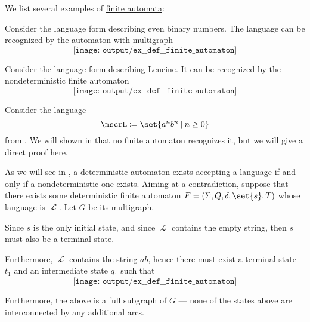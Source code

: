 \begin{example}\label{ex:def:finite_automaton}
  We list several examples of \hyperref[def:finite_automaton]{finite automata}:
  \begin{thmenum}
     Consider the language form  describing even binary numbers. The language can be recognized by the automaton with multigraph
    \begin{equation*}
      \texttt{[image: output/ex\_\_def\_\_finite\_automaton]}
    \end{equation*}

     Consider the language form  describing Leucine. It can be recognized by the nondeterministic finite automaton
    \begin{equation*}
      \texttt{[image: output/ex\_\_def\_\_finite\_automaton]}
    \end{equation*}

     Consider the language
    \begin{equation*}
      \mscrL \coloneqq \set{ a^n b^n \given n \geq 0 }
    \end{equation*}
    from . We will shown in  that no finite automaton recognizes it, but we will give a direct proof here.

    As we will see in , a deterministic automaton exists accepting a language if and only if a nondeterministic one exists. Aiming at a contradiction, suppose that there exists some deterministic finite automaton \( F = (\Sigma, Q, \delta, \set{ s }, T) \) whose language is \( \mscrL \). Let \( G \) be its multigraph.

    Since \( s \) is the only initial state, and since \( \mscrL \) contains the empty string, then \( s \) must also be a terminal state.

    Furthermore, \( \mscrL \) contains the string \( ab \), hence there must exist a terminal state \( t_1 \) and an intermediate state \( q_1 \) such that
    \begin{equation*}
      \texttt{[image: output/ex\_\_def\_\_finite\_automaton]}
    \end{equation*}

    Furthermore, the above is a full subgraph of \( G \) --- none of the states above are interconnected by any additional arcs.


\end{thmenum}
\end{example}
